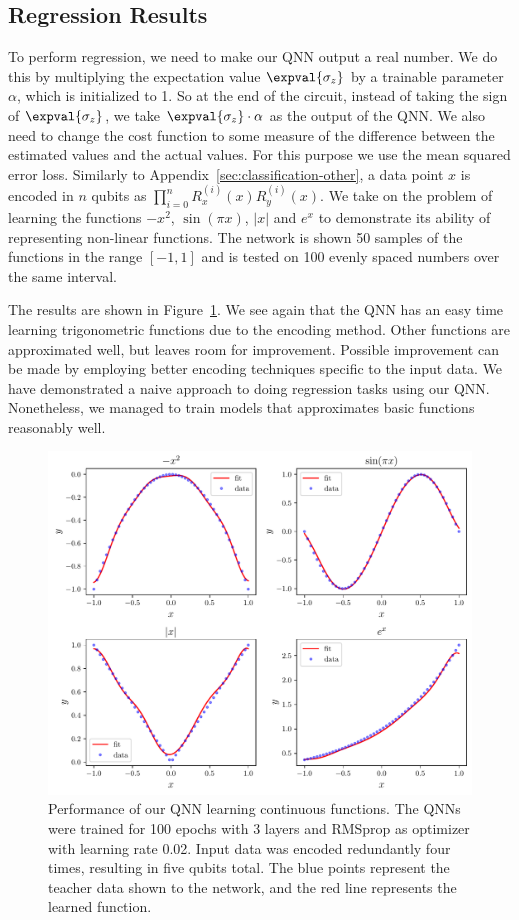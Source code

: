 \documentclass[a4paper,10pt]{article}
\begin{document}
\begin{appendices}
\section{Regression Results} \label{sec:qnn-regression}
To perform regression, we need to make our QNN output a real number.
We do this by multiplying the expectation value $\expval{\sigma_z}$ by a trainable parameter $\alpha$, which is initialized to 1.
So at the end of the circuit, instead of taking the sign of $\expval{\sigma_z}$, we take $\expval{\sigma_z} \cdot \alpha$ as the output of the QNN.
We also need to change the cost function to some measure of the difference between the estimated values and the actual values.
For this purpose we use the mean squared error loss.
Similarly to Appendix~\ref{sec:classification-other}, a data point $x$ is encoded in $n$ qubits as $\prod_{i=0}^{n}R_x^{(i)}(x)R_y^{(i)}(x)$.
We take on the problem of learning the functions $-x^2$, $\sin(\pi x)$, $|x|$ and $e^x$ to demonstrate its ability of representing non-linear functions.
The network is shown 50 samples of the functions in the range $[-1, 1]$ and is tested on 100 evenly spaced numbers over the same interval.

The results are shown in Figure~\ref{fig:qnn_regression_results}.
We see again that the QNN has an easy time learning trigonometric functions due to the encoding method.
Other functions are approximated well, but leaves room for improvement.
Possible improvement can be made by employing better encoding techniques specific to the input data.
We have demonstrated a naive approach to doing regression tasks using our QNN.
Nonetheless, we managed to train models that approximates basic functions reasonably well.

\begin{figure}[ht]
	\centering
	\includegraphics[width=.65\linewidth]{figures/qnn_regression.pdf}
	\caption{Performance of our QNN learning continuous functions. The QNNs were trained for 100 epochs with 3 layers and RMSprop as optimizer with learning rate 0.02. Input data was encoded redundantly four times, resulting in five qubits total. The blue points represent the teacher data shown to the network, and the red line represents the learned function.}
	\label{fig:qnn_regression_results}
\end{figure}

\end{appendices}
\end{document}
